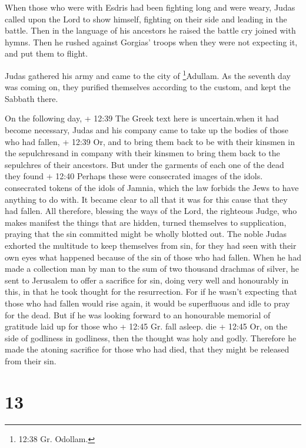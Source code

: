  When those who were with Esdris had been fighting long and
were weary, Judas called upon the Lord to show himself, fighting on
their side and leading in the battle.  Then in the language
of his ancestors he raised the battle cry joined with hymns. Then he
rushed against Gorgias' troops when they were not expecting it, and put
them to flight.

 Judas gathered his army and came to the city of
\footnote{12:38 Gr. Odollam.}Adullam. As the seventh day was coming on,
they purified themselves according to the custom, and kept the Sabbath
there.

 On the following day, + 12:39 The Greek text here is
uncertain.when it had become necessary, Judas and his company came to
take up the bodies of those who had fallen, + 12:39 Or, and to bring
them back to be with their kinsmen in the sepulchresand in company with
their kinsmen to bring them back to the sepulchres of their ancestors.
 But under the garments of each one of the dead they found
+ 12:40 Perhaps these were consecrated images of the idols. consecrated
tokens of the idols of Jamnia, which the law forbids the Jews to have
anything to do with. It became clear to all that it was for this cause
that they had fallen.  All therefore, blessing the ways of
the Lord, the righteous Judge, who makes manifest the things that are
hidden,  turned themselves to supplication, praying that
the sin committed might be wholly blotted out. The noble Judas exhorted
the multitude to keep themselves from sin, for they had seen with their
own eyes what happened because of the sin of those who had fallen.
 When he had made a collection man by man to the sum of two
thousand drachmas of silver, he sent to Jerusalem to offer a sacrifice
for sin, doing very well and honourably in this, in that he took thought
for the resurrection.  For if he wasn't expecting that
those who had fallen would rise again, it would be superfluous and idle
to pray for the dead.  But if he was looking forward to an
honourable memorial of gratitude laid up for those who + 12:45 Gr. fall
asleep. die + 12:45 Or, on the side of godliness in godliness, then the
thought was holy and godly. Therefore he made the atoning sacrifice for
those who had died, that they might be released from their sin.

\hypertarget{section-11}{%
\section{13}\label{section-11}}

